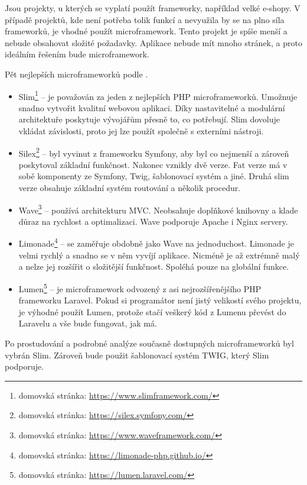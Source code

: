             Jsou projekty, u kterých se vyplatí použít frameworky, například velké e-shopy. V případě projektů, kde není potřeba tolik funkcí a nevyužila by se na plno síla frameworků, je vhodné použít microframework. Tento projekt je spíše menší a nebude obsahovat složité požadavky. Aplikace nebude mít mnoho stránek, a proto ideálním řešením bude microframework.
            
            Pět nejlepších microframeworků podle \cite{microframeworks}.
            
            \begin{itemize}
                \item Slim\footnote{domovská stránka: \url{https://www.slimframework.com/}} – je považován za jeden z nejlepších PHP microframeworků. Umožnuje snadno vytvořit kvalitní webovou aplikaci. Díky nastavitelné a modulární architektuře poskytuje vývojářům přesně to, co potřebují. Slim dovoluje vkládat závislosti, proto jej lze použít společně s externími nástroji.
                
                \item Silex\footnote{domovská stránka: \url{https://silex.symfony.com/}} – byl vyvinut z frameworku Symfony, aby byl co nejmenší a zároveň poskytoval základní funkčnost. Nakonec vznikly dvě verze. Fat verze má v sobě komponenty ze Symfony, Twig, šablonovací systém a jiné. Druhá slim verze obsahuje základní systém routování a několik procedur. 
                
                \item Wave\footnote{domovská stránka: \url{https://www.waveframework.com/}} – používá architekturu MVC. Neobsahuje doplňkové knihovny a klade důraz na rychlost a optimalizaci. Wave podporuje Apache i Nginx servery.
                
                \item Limonade\footnote{domovská stránka: \url{https://limonade-php.github.io/}} – se zaměřuje obdobně jako Wave na jednoduchost. Limonade je velmi rychlý a snadno se v něm vyvíjí aplikace. Nicméně je až extrémně malý a nelze jej rozšířit o složitější funkčnost. Spoléhá pouze na globální funkce.
                
                \item Lumen\footnote{domovská stránka: \url{https://lumen.laravel.com/}} – je microframework odvozený z asi nejrozšířenějšího PHP frameworku Laravel. Pokud si programátor není jistý velikostí svého projektu, je výhodné použít Lumen, protože stačí veškerý kód z Lumenu převést do Laravelu a vše bude fungovat, jak má.
            \end{itemize}
        
        Po prostudování a podrobné analýze současně dostupných microframeworků byl vybrán Slim. Zároveň bude použit šablonovací systém TWIG, který Slim podporuje.
        
